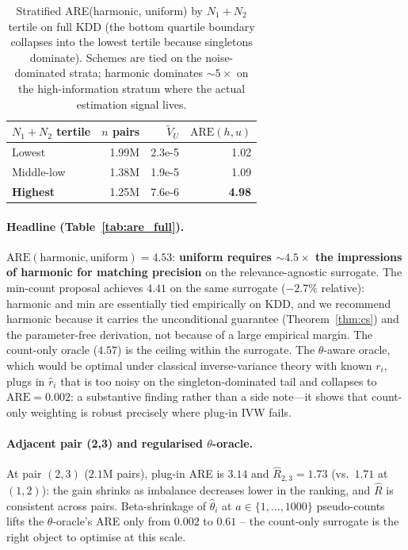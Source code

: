 \documentclass[sigconf]{acmart}
\begin{document}
\begin{table}[t]
\caption{Stratified ARE(harmonic, uniform) by $N_1+N_2$ tertile on full
KDD (the bottom quartile boundary collapses into the lowest tertile
because singletons dominate). Schemes are tied on the noise-dominated
strata; harmonic dominates $\sim 5\times$ on the high-information stratum
where the actual estimation signal lives.}
\label{tab:strat}
\centering
\small
\begin{tabular}{lrrr}
\toprule
$N_1+N_2$ tertile          & $n$ pairs & $\widetilde V_U$  & $\mathrm{ARE}(h,u)$ \\
\midrule
Lowest                  & 1.99M & 2.3e-5 & 1.02 \\
Middle-low              & 1.38M & 1.9e-5 & 1.09 \\
\textbf{Highest}        & 1.25M & 7.6e-6 & \textbf{4.98} \\
\bottomrule
\end{tabular}
\end{table}

\paragraph{Headline (Table~\ref{tab:are_full}).}
$\mathrm{ARE}(\text{harmonic},\text{uniform})=4.53$:
\textbf{uniform requires $\sim 4.5\times$ the impressions of harmonic
for matching precision} on the relevance-agnostic surrogate. The
min-count proposal achieves $4.41$ on the same surrogate ($-2.7\%$
relative): harmonic and min are essentially tied empirically on KDD,
and we recommend harmonic because it carries the unconditional
guarantee (Theorem~\ref{thm:cs}) and the parameter-free derivation,
not because of a large empirical margin. The count-only oracle
($4.57$) is the ceiling within the surrogate. The $\theta$-aware
oracle, which would be optimal under classical inverse-variance theory
with known $r_i$, plugs in $\hat r_i$
that is too noisy on the singleton-dominated tail and collapses to
$\mathrm{ARE}=0.002$: a substantive finding rather than a side
note---it shows that count-only weighting is robust precisely where
plug-in IVW fails.

\paragraph{Adjacent pair (2,3) and regularised $\theta$-oracle.}
At pair $(2,3)$ ($2.1\mathrm{M}$ pairs), plug-in ARE is $3.14$ and
$\hat R_{2,3}=1.73$ (vs.\ $1.71$ at $(1,2)$): the gain shrinks as
imbalance decreases lower in the ranking, and $\hat R$ is consistent
across pairs. Beta-shrinkage of $\hat\theta_i$ at $a\in\{1,\ldots,1000\}$
pseudo-counts lifts the $\theta$-oracle's ARE only from $0.002$ to
$0.61$ -- the count-only surrogate is the right object to optimise at
this scale.
\end{document}
